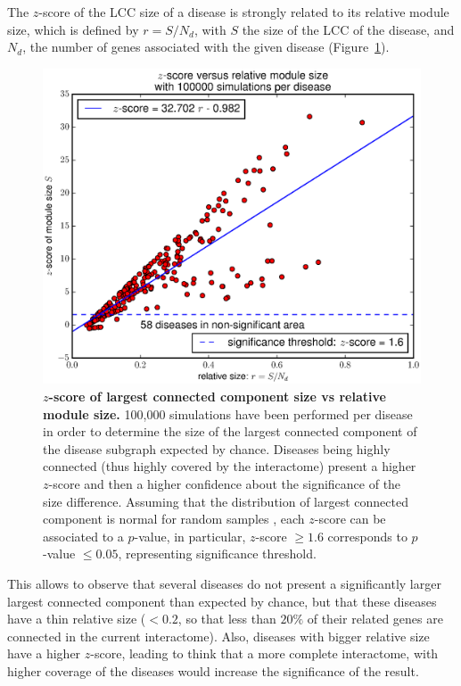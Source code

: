 \documentclass[letterpaper]{article}
\begin{document}
		The $z$-score of the LCC size of a disease is strongly related to its relative module size, which is
		defined by $r = S/N_d$, with $S$ the size of the LCC of the disease, and $N_d$, the number of genes
		associated with the given disease (Figure~\ref{fig:zscore}).

		\begin{figure}[!h]
			\includegraphics[width=.5\textwidth]{images/S4.b100000.eps}
			\caption{\textbf {$z$-score of largest connected component size vs relative module size.}
			100,000 simulations have been performed per disease in order to determine the size of the largest connected component
			of the disease subgraph expected by chance. Diseases being highly connected (thus highly covered by the interactome)
			present a higher $z$-score and then a higher confidence about the significance of the size difference.
			Assuming that the distribution of largest connected component is normal for random
			samples \citep{fluctuationGiantComponent}, each $z$-score can be associated to a $p$-value, in particular,
			$z$-score $\geq 1.6$ corresponds to $p$-value $\leq 0.05$, representing significance threshold. \label{fig:zscore}}
		\end{figure}

		This allows to observe that several diseases do not present a significantly larger largest connected component
		than expected by chance, but that these diseases have a thin relative size ($< 0.2$, so that less than $20\%$
		of their related genes are connected in the current interactome). Also, diseases with bigger relative size
		have a higher $z$-score, leading to think that a more complete interactome, with higher coverage of the diseases
		would increase the significance of the result.
\end{document}
